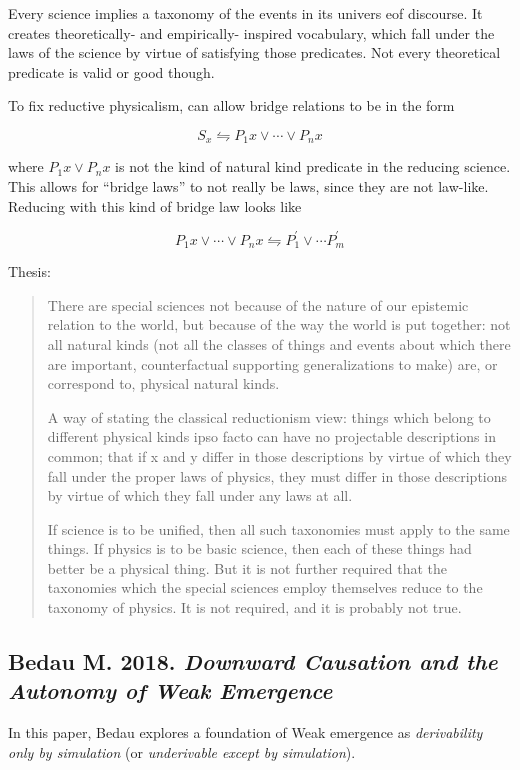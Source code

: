 \documentclass{article}
\newcommand{\ti}[1]{\textit{#1}}
\newcommand{\p}{^\prime}
\newcommand{\annbibtitle}[2]{\subsection*{#1. \ti{#2}}}
\begin{document}
Every science implies a taxonomy of the events in its univers eof discourse. It creates theoretically- and empirically- inspired vocabulary, which fall under the laws of the science by virtue of satisfying those predicates. Not every theoretical predicate is valid or good though.

To fix reductive physicalism, can allow bridge relations to be in the form

$$
    S_x \leftrightharpoons P_1 x \lor \cdots \lor P_n x
$$

where $P_1 x \lor P_n x$ is not the kind of natural kind predicate in the reducing science. This allows for ``bridge laws'' to not really be laws, since they are not law-like. Reducing with this kind of bridge law looks like

$$
    P_1 x \lor \cdots \lor P_n x \leftrightharpoons P\p_1 \lor \cdots P\p_m
$$

Thesis:

\begin{quote}
There are special sciences not because of the nature of our epistemic relation to the world, but because of the way the world is put together: not all natural kinds (not all the classes of things and events about which there are important, counterfactual supporting generalizations to make) are, or correspond to, physical natural kinds.

A way of stating the classical reductionism view: things which belong to different physical kinds ipso facto can have no projectable descriptions in common; that if x and y differ in those descriptions by virtue of which they fall under the proper laws of physics, they must differ in those descriptions by virtue of which they fall under any laws at all.

If science is to be unified, then all such taxonomies must apply to the same things. If physics is to be basic science, then each of these things had better be a physical thing. But it is not further required that the taxonomies which the special sciences employ themselves reduce to the taxonomy of physics. It is not required, and it is probably not true.
\end{quote}

\annbibtitle{Bedau M. 2018}{Downward Causation and the Autonomy of Weak Emergence}

In this paper, Bedau explores a foundation of Weak emergence as \ti{derivability only by simulation} (or \ti{underivable except by simulation}).
\end{document}
